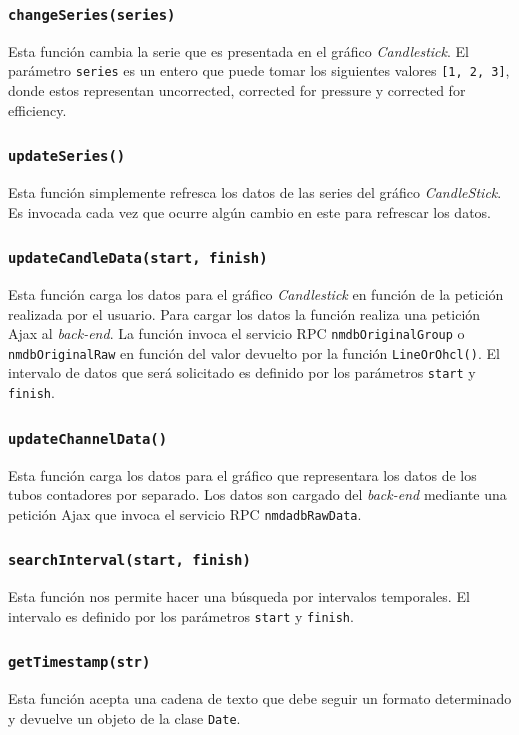 		\subsubsection{\texttt{changeSeries(series)}}
			Esta función cambia la serie que es presentada en el gráfico \emph{Candlestick}. El parámetro \texttt{series} es un entero que
			puede tomar los siguientes valores \texttt{[1, 2, 3]}, donde estos representan uncorrected, corrected for pressure y
			corrected for efficiency.
		\subsubsection{\texttt{updateSeries()}}
			Esta función simplemente refresca los datos de las series del gráfico \emph{CandleStick}. Es invocada cada vez que ocurre
			algún cambio en este para refrescar los datos.
		\subsubsection{\texttt{updateCandleData(start, finish)}}
			Esta función carga los datos para el gráfico \emph{Candlestick} en función de la petición realizada por el usuario. Para
			cargar los datos la función realiza una petición Ajax al \emph{back-end}. La función invoca el servicio RPC
			\texttt{nmdbOriginalGroup} o \texttt{nmdbOriginalRaw} en función del valor devuelto por la función \texttt{LineOrOhcl()}. El
			intervalo de datos que será solicitado es definido por los parámetros \texttt{start} y \texttt{finish}. 
		\subsubsection{\texttt{updateChannelData()}}
			Esta función carga los datos para el gráfico que representara los datos de los tubos contadores por separado. Los datos son
			cargado del \emph{back-end} mediante una petición Ajax que invoca el servicio RPC \texttt{nmdadbRawData}.
		\subsubsection{\texttt{searchInterval(start, finish)}}
			Esta función nos permite hacer una búsqueda por intervalos temporales. El intervalo es definido por los parámetros
			\texttt{start} y \texttt{finish}.
		\subsubsection{\texttt{getTimestamp(str)}}
			Esta función acepta una cadena de texto que debe seguir un formato determinado y devuelve un objeto de la clase \texttt{Date}. 

